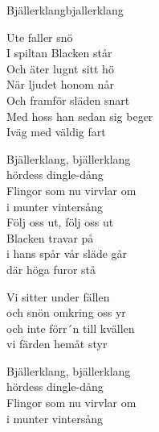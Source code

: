 \begin{song}{Bjällerklang}{bjallerklang}
\begin{vers}
Ute faller snö\\
I spiltan Blacken står\\
Och äter lugnt sitt hö\\
När ljudet honom når\\
Och framför släden snart\\
Med hoss han sedan sig beger\\
Iväg med väldig fart\\
\end{vers}
\begin{vers}
Bjällerklang, bjällerklang\\
hördess dingle-dång\\
Flingor som nu virvlar om\\
i munter vintersång\\
Följ oss ut, följ oss ut\\
Blacken travar på\\
i hans spår vår släde går\\
där höga furor stå\\
\end{vers}
\begin{vers}
Vi sitter under fällen\\
och snön omkring oss yr\\
och inte förr´n till kvällen\\
vi färden hemåt styr\\
\end{vers}
\begin{vers}
Bjällerklang, bjällerklang\\
hördess dingle-dång\\
Flingor som nu virvlar om\\
i munter vintersång\\
\end{vers}
\end{song}
